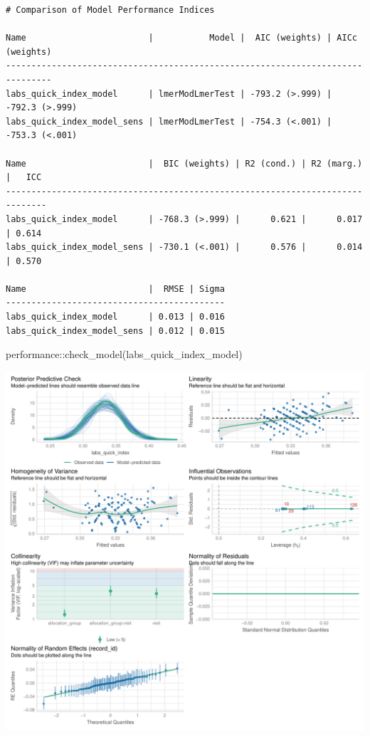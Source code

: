 \documentclass[
  letterpaper,
  DIV=11,
  numbers=noendperiod]{scrartcl}
\newenvironment{Shaded}{\begin{snugshade}}{\end{snugshade}}
\newcommand{\FunctionTok}[1]{\textcolor[rgb]{0.28,0.35,0.67}{#1}}
\newcommand{\NormalTok}[1]{\textcolor[rgb]{0.00,0.23,0.31}{#1}}
\newcommand{\SpecialCharTok}[1]{\textcolor[rgb]{0.37,0.37,0.37}{#1}}
\begin{document}
\begin{verbatim}
# Comparison of Model Performance Indices

Name                        |           Model |  AIC (weights) | AICc (weights)
-------------------------------------------------------------------------------
labs_quick_index_model      | lmerModLmerTest | -793.2 (>.999) | -792.3 (>.999)
labs_quick_index_model_sens | lmerModLmerTest | -754.3 (<.001) | -753.3 (<.001)

Name                        |  BIC (weights) | R2 (cond.) | R2 (marg.) |   ICC
------------------------------------------------------------------------------
labs_quick_index_model      | -768.3 (>.999) |      0.621 |      0.017 | 0.614
labs_quick_index_model_sens | -730.1 (<.001) |      0.576 |      0.014 | 0.570

Name                        |  RMSE | Sigma
-------------------------------------------
labs_quick_index_model      | 0.013 | 0.016
labs_quick_index_model_sens | 0.012 | 0.015
\end{verbatim}

\begin{Shaded}
\begin{Highlighting}[]
\NormalTok{performance}\SpecialCharTok{::}\FunctionTok{check\_model}\NormalTok{(labs\_quick\_index\_model)}
\end{Highlighting}
\end{Shaded}

\includegraphics{Outcomes_V1V2V3_files/figure-pdf/labs_quick_index_4-1.pdf}
\end{document}
